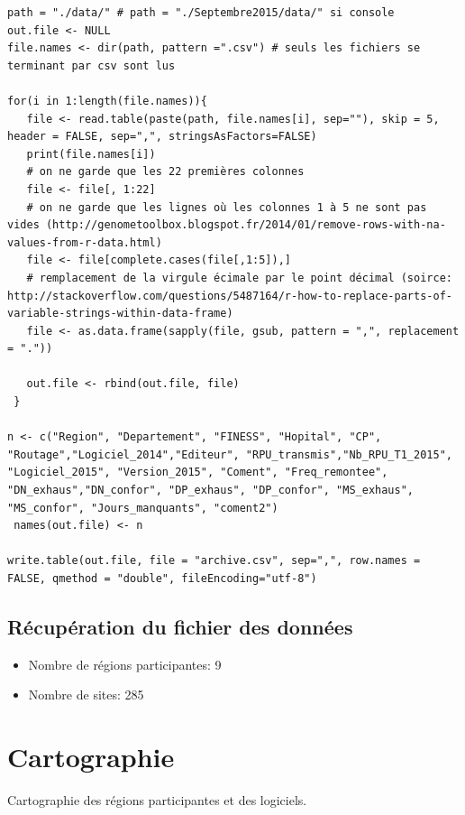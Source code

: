 \documentclass[]{article}
\begin{document}
\begin{verbatim}
path = "./data/" # path = "./Septembre2015/data/" si console
out.file <- NULL
file.names <- dir(path, pattern =".csv") # seuls les fichiers se terminant par csv sont lus

for(i in 1:length(file.names)){
   file <- read.table(paste(path, file.names[i], sep=""), skip = 5, header = FALSE, sep=",", stringsAsFactors=FALSE)
   print(file.names[i])
   # on ne garde que les 22 premières colonnes
   file <- file[, 1:22]
   # on ne garde que les lignes où les colonnes 1 à 5 ne sont pas vides (http://genometoolbox.blogspot.fr/2014/01/remove-rows-with-na-values-from-r-data.html)
   file <- file[complete.cases(file[,1:5]),]
   # remplacement de la virgule écimale par le point décimal (soirce: http://stackoverflow.com/questions/5487164/r-how-to-replace-parts-of-variable-strings-within-data-frame)
   file <- as.data.frame(sapply(file, gsub, pattern = ",", replacement = "."))

   out.file <- rbind(out.file, file)
 }

n <- c("Region", "Departement", "FINESS", "Hopital", "CP", "Routage","Logiciel_2014","Editeur", "RPU_transmis","Nb_RPU_T1_2015", "Logiciel_2015", "Version_2015", "Coment", "Freq_remontee", "DN_exhaus","DN_confor", "DP_exhaus", "DP_confor", "MS_exhaus", "MS_confor", "Jours_manquants", "coment2")
 names(out.file) <- n

write.table(out.file, file = "archive.csv", sep=",", row.names = FALSE, qmethod = "double", fileEncoding="utf-8")
\end{verbatim}

\subsection{Récupération du fichier des
données}\label{recuperation-du-fichier-des-donnees}

\begin{itemize}
\itemsep1pt\parskip0pt
\item
  Nombre de régions participantes: 9
\item
  Nombre de sites: 285
\end{itemize}

\section{Cartographie}\label{cartographie}

Cartographie des régions participantes et des logiciels.
\end{document}
